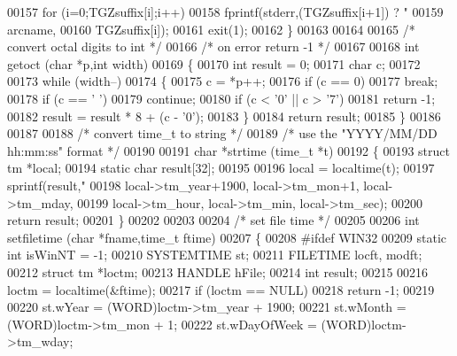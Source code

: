 \begin{DoxyCode}
{00157   \textcolor{keywordflow}{for} (i=0;TGZsuffix[i];i++)
00158     fprintf(stderr,(TGZsuffix[i+1]) ? \textcolor{stringliteral}{"%
00159             arcname,
00160             TGZsuffix[i]);
00161   exit(1);
00162 \}
00163 
00164 
00165 \textcolor{comment}{/* convert octal digits to int */}
00166 \textcolor{comment}{/* on error return -1 */}
00167 
00168 \textcolor{keywordtype}{int} getoct (\textcolor{keywordtype}{char} *p,\textcolor{keywordtype}{int} width)
00169 \{
00170   \textcolor{keywordtype}{int} result = 0;
00171   \textcolor{keywordtype}{char} c;
00172 
00173   \textcolor{keywordflow}{while} (width--)
00174     \{
00175       c = *p++;
00176       \textcolor{keywordflow}{if} (c == 0)
00177         \textcolor{keywordflow}{break};
00178       \textcolor{keywordflow}{if} (c == \textcolor{charliteral}{' '})
00179         \textcolor{keywordflow}{continue};
00180       \textcolor{keywordflow}{if} (c < '0' || c > \textcolor{charliteral}{'7'})
00181         \textcolor{keywordflow}{return} -1;
00182       result = result * 8 + (c - \textcolor{charliteral}{'0'});
00183     \}
00184   \textcolor{keywordflow}{return} result;
00185 \}
00186 
00187 
00188 \textcolor{comment}{/* convert time\_t to string */}
00189 \textcolor{comment}{/* use the "YYYY/MM/DD hh:mm:ss" format */}
00190 
00191 \textcolor{keywordtype}{char} *strtime (time\_t *t)
00192 \{
00193   \textcolor{keyword}{struct }tm   *local;
00194   \textcolor{keyword}{static} \textcolor{keywordtype}{char} result[32];
00195 
00196   local = localtime(t);
00197   sprintf(result,\textcolor{stringliteral}{"%
00198           local->tm\_year+1900, local->tm\_mon+1, local->tm\_mday,
00199           local->tm\_hour, local->tm\_min, local->tm\_sec);
00200   \textcolor{keywordflow}{return} result;
00201 \}
00202 
00203 
00204 \textcolor{comment}{/* set file time */}
00205 
00206 \textcolor{keywordtype}{int} setfiletime (\textcolor{keywordtype}{char} *fname,time\_t ftime)
00207 \{
00208 \textcolor{preprocessor}{#ifdef WIN32}
00209   \textcolor{keyword}{static} \textcolor{keywordtype}{int} isWinNT = -1;
00210   SYSTEMTIME st;
00211   FILETIME locft, modft;
00212   \textcolor{keyword}{struct }tm *loctm;
00213   HANDLE hFile;
00214   \textcolor{keywordtype}{int} result;
00215 
00216   loctm = localtime(&ftime);
00217   \textcolor{keywordflow}{if} (loctm == NULL)
00218     \textcolor{keywordflow}{return} -1;
00219 
00220   st.wYear         = (WORD)loctm->tm\_year + 1900;
00221   st.wMonth        = (WORD)loctm->tm\_mon + 1;
00222   st.wDayOfWeek    = (WORD)loctm->tm\_wday;
}}}
\end{DoxyCode}
